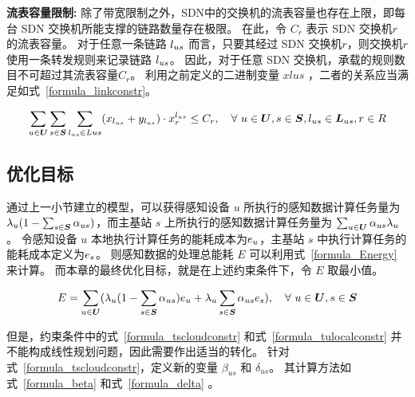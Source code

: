 \textbf{流表容量限制:}
除了带宽限制之外，SDN中的交换机的流表容量也存在上限，即每台 SDN 交换机所能支撑的链路数量存在极限。
在此，令 $C_r$ 表示 SDN 交换机$r$的流表容量。
对于任意一条链路 $l_{us}$ 而言，只要其经过 SDN 交换机$r$，则交换机$r$使用一条转发规则来记录链路 $l_{us}$。
因此，对于任意 SDN 交换机，承载的规则数目不可超过其流表容量$C_r$。
利用之前定义的二进制变量 $xlus$ ，二者的关系应当满足如式~\eqref{formula_linkconstr}。

\vspace{-1em}
\begin{equation}
\label{formula_linkconstr}
\begin{gathered}
\sum\limits_{u \in \boldsymbol{U}}\sum\limits_{s \in \boldsymbol{S}}\sum\limits_{l_{us} \in Lus}(x_{l_{us}} + y_{l_{us}}) \cdot x^{l_{us}}_{r} \leq C_r,
\quad  \forall\ u \in \boldsymbol{U}, s \in \boldsymbol{S}, l_{us} \in \boldsymbol{L}_{us}, r\in R\\
\end{gathered}
\end{equation}

\subsection{优化目标}

通过上一小节建立的模型，可以获得感知设备 $u$ 所执行的感知数据计算任务量为 ${\lambda}_{u}(1-\sum_{s\in \boldsymbol{S}}{\alpha}_{us})$，而主基站 $s$ 上所执行的感知数据计算任务量为 $\sum_{u\in \boldsymbol{U}}{\alpha}_{us}{\lambda}_{u}$。
令感知设备 $u$ 本地执行计算任务的能耗成本为$e_u$，主基站 $s$ 中执行计算任务的能耗成本定义为$e_s$。
则感知数据的处理总能耗 $E$ 可以利用式~\eqref{formula_Energy} 来计算。
而本章的最终优化目标，就是在上述约束条件下，令 $E$ 取最小值。

\begin{equation}
\label{formula_Energy}
  \begin{gathered}
    E = \sum\limits_{u\in \boldsymbol{U}}({\lambda}_{u}(1-\sum\limits_{s\in \boldsymbol{S}}{\alpha}_{us})e_u + {\lambda}_{u}\sum\limits_{s\in \boldsymbol{S}}{\alpha}_{us}e_s),
    \quad \forall\ u \in \boldsymbol{U}, s \in \boldsymbol{S}
  \end{gathered}
\end{equation}

但是，约束条件中的式~\eqref{formula_tscloudconstr} 和式~\eqref{formula_tulocalconstr} 并不能构成线性规划问题，因此需要作出适当的转化。
针对式~\eqref{formula_tscloudconstr}，定义新的变量 $\beta_{us}$ 和 $\delta_{us}$。
其计算方法如式~\eqref{formula_beta} 和式~\eqref{formula_delta} 。

